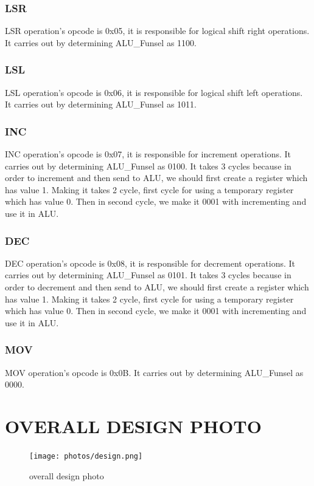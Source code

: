 \documentclass[pdftex,12pt,a4paper]{article}
\begin{document}
\subsubsection{LSR}
    LSR operation's opcode is 0x05, it is responsible for logical shift right operations. It carries out by determining ALU_Funsel as 1100.
\subsubsection{LSL}
    LSL operation's opcode is 0x06, it is responsible for logical shift left operations. It carries out by determining ALU_Funsel as 1011.
\subsubsection{INC}
    INC operation's opcode is 0x07, it is responsible for increment operations. It carries out by determining ALU_Funsel as 0100.
It takes 3 cycles because in order to increment and then send to ALU, we should first create a register
which has value 1. Making it takes 2 cycle, first cycle for using a temporary register which has value 0.
Then in second cycle, we make it 0001 with incrementing and use it in ALU.
\subsubsection{DEC}
    DEC operation's opcode is 0x08, it is responsible for decrement operations. It carries out by determining ALU_Funsel as 0101.
It takes 3 cycles because in order to decrement and then send to ALU, we should first create a register
which has value 1. Making it takes 2 cycle, first cycle for using a temporary register which has value 0.
Then in second cycle, we make it 0001 with incrementing and use it in ALU.
\subsubsection{MOV}
    MOV operation's opcode is 0x0B. It carries out by determining ALU_Funsel as 0000.


\section{OVERALL DESIGN PHOTO}


\begin{figure}[H]
    \centering
    \texttt{[image: photos/design.png]}	
    \caption{overall design photo}
    \label{implementation}
\end{figure}
\end{document}
